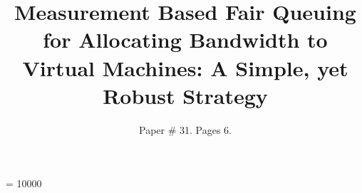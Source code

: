 \documentclass{sig-alternate-10pt}
\begin{document}
\widowpenalty = 10000

\title{Measurement Based Fair Queuing for Allocating Bandwidth to Virtual Machines: A Simple, yet Robust Strategy}

\author{Paper \# 31. Pages 6.}

\maketitle






\end{document}
